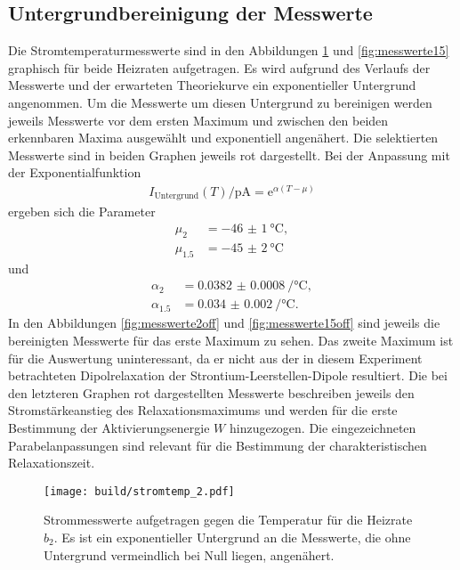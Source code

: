 \subsection{Untergrundbereinigung der Messwerte}

Die Stromtemperaturmesswerte sind in den Abbildungen \ref{fig:messwerte2} und
\ref{fig:messwerte15} graphisch für beide Heizraten aufgetragen. Es wird
aufgrund des Verlaufs der Messwerte und der erwarteten Theoriekurve ein
exponentieller Untergrund angenommen. Um die Messwerte um diesen Untergrund zu bereinigen
werden jeweils Messwerte vor dem ersten Maximum und zwischen den beiden erkennbaren
Maxima ausgewählt und exponentiell angenähert. Die selektierten Messwerte sind in beiden
Graphen jeweils rot dargestellt. Bei der Anpassung mit der Exponentialfunktion
\begin{align}
  I_\text{Untergrund}(T)/\si{\pico\ampere} = \mathrm{e}^{\alpha(T-\mu)}
\end{align}
ergeben sich die Parameter
\begin{align}
  \mu_{2} &= \SI{-46(1)}{\celsius}, \\
  \mu_{1.5} &= \SI{-45(2)}{\celsius}
  \label{eqn:disk1}
\end{align}
und
\begin{align}
  \alpha_{2} &= \SI{0.0382(8)}{\per\celsius}, \\
  \alpha_{1.5} &= \SI{0.034(2)}{\per\celsius}.
  \label{eqn:disk2}
\end{align}
In den Abbildungen \ref{fig:messwerte2off} und \ref{fig:messwerte15off} sind
jeweils die bereinigten Messwerte für das erste Maximum zu sehen. Das zweite Maximum ist
für die Auswertung uninteressant, da er nicht aus der in diesem Experiment
betrachteten Dipolrelaxation der Strontium-Leerstellen-Dipole resultiert.
Die bei den letzteren Graphen rot dargestellten Messwerte beschreiben jeweils den
Stromstärkeanstieg des Relaxationsmaximums und werden für die erste Bestimmung der
Aktivierungsenergie $W$ hinzugezogen. Die eingezeichneten Parabelanpassungen sind relevant
für die Bestimmung der charakteristischen Relaxationszeit.

\begin{figure}
  \centering
  \texttt{[image: build/stromtemp\_2.pdf]}
  \caption{Strommesswerte aufgetragen gegen die Temperatur für die Heizrate $b_{2}$. Es ist ein exponentieller
  Untergrund an die Messwerte, die ohne Untergrund vermeindlich bei Null liegen, angenähert.}
  \label{fig:messwerte2}
\end{figure}

